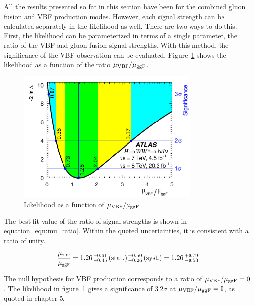 All the results presented so far in this section have been for the combined gluon fusion and VBF production modes. However, each signal strength can be calculated separately in the likelihood as well. There are two ways to do this. First, the likelihood can be parameterized in terms of a single parameter, the ratio of the VBF and gluon fusion signal strengths. With this method, the significance of the VBF observation can be evaluated. Figure~\ref{fig:mu_ratio} shows the likelihood as a function of the ratio $\mu_{{\rm VBF}}/\mu_{{\rm ggF}}$.

\begin{figure}[h!]
  \centering
  \captionsetup{justification=centering}

  \includegraphics[width=0.8\textwidth]{figures/WW_muratio}
  \caption{Likelihood as a function of $\mu_{{\rm VBF}}/\mu_{{\rm ggF}}$\cite{WW2015}.}
  \label{fig:mu_ratio}
\end{figure}

The best fit value of the ratio of signal strengths is shown in equation~\ref{eqn:mu_ratio}. Within the quoted uncertainties, it is consistent with a ratio of unity. 

\begin{equation}
  \frac{\mu_{{\textsc{\scriptsize vbf}}}}{\mu_{{\tiny\rm gg}{\textsc{\scriptsize f}}}} 
  = 1.26\,^{+0.61}_{-0.45}\,(\rm{stat.})\,^{+0.50}_{-0.26}\,(\rm{syst.})
  = 1.26\,^{+0.79}_{-0.53} 
\label{eqn:mu_ratio}
\end{equation}

The null hypothesis for VBF production corresponds to a ratio of $\mu_{{\rm VBF}}/\mu_{{\rm ggF}} = 0$. The likelihood in figure~\ref{fig:mu_ratio} gives a significance of $3.2\sigma$ at $\mu_{{\rm VBF}}/\mu_{{\rm ggF}} = 0$, as quoted in chapter 5. 

